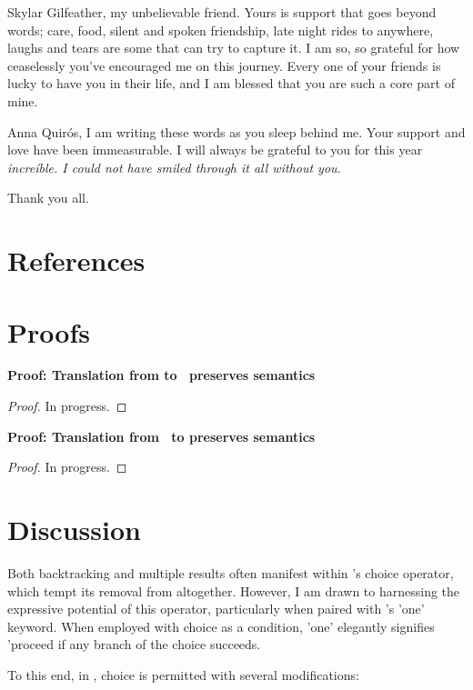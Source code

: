 \documentclass[manuscript,screen,review, 12pt, nonacm]{acmart}
\begin{document}
Skylar Gilfeather, my unbelievable friend. Yours is support that goes
beyond words; care, food, silent and spoken friendship, late night rides to
anywhere, laughs and tears are some that can try to capture it. I am so, so
grateful for how ceaselessly you've encouraged me on this journey. Every one
of your friends is lucky to have you in their life, and I am blessed that 
you are such a core part of mine. 

Anna Quirós, I am writing these words as you sleep behind me. Your support
and love have been immeasurable. I will always be grateful to you for this
year \it{increíble}. I could not have smiled through it all without you. 

Thank you all. 

\section{References}



\renewcommand\thesection{\Alph{section}}
\setcounter{section}{0}
\section{Proofs}
\begin{outline}
\1 \bf{Proof: Translation from \VMinus to \D\ preserves semantics }
\begin{proof}
  In progress. 
\end{proof}
\1 \bf{Proof: Translation from \PPlus\ to \VMinus preserves semantics }
\begin{proof}
  In progress. 
\end{proof}
\end{outline}

\section{Discussion}

Both backtracking and multiple results often manifest within \VC's choice
operator, which tempt its removal from \VMinus altogether. However, I am drawn
to harnessing the expressive potential of this operator, particularly when
paired with \VC's 'one' keyword. When employed with choice as a condition, 'one'
elegantly signifies 'proceed if any branch of the choice succeeds. 

To this end, in \VMinus, choice is permitted with several modifications:
\end{document}
